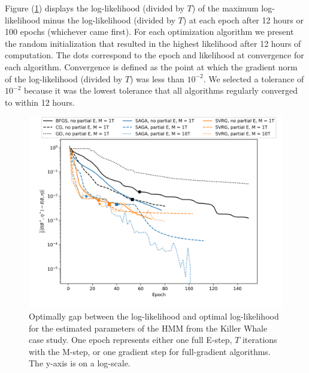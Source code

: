 Figure (\ref{fig:ll_trace_case}) displays the log-likelihood (divided by $T$) of the maximum log-likelihood minus the log-likelihood (divided by $T$) at each epoch after 12 hours or 100 epochs (whichever came first). For each optimization algorithm we present the random initialization that resulted in the highest likelihood after 12 hours of computation. The dots correspond to the epoch and likelihood at convergence for each algorithm.  Convergence is defined as the point at which the gradient norm of the log-likelihood (divided by $T$) was less than $10^{-2}$. We selected a tolerance of $10^{-2}$ because it was the lowest tolerance that all algorithms regularly converged to within 12 hours. 
%
\begin{figure}
    \centering
    \includegraphics[width=6in]{../plt/log-like_v_epoch_K-3-3.png}
    \caption{Optimally gap between the log-likelihood and optimal log-likelihood for the estimated parameters of the HMM from the Killer Whale case study. One epoch represents either one full E-step, $T$ iterations with the M-step, or one gradient step for full-gradient algorithms. The y-axis is on a log-scale.}
    \label{fig:ll_trace_case}
\end{figure}

